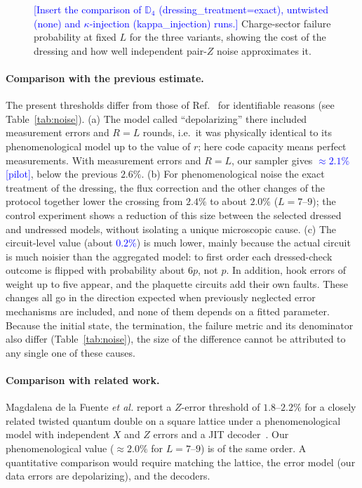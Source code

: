 \documentclass[a4paper]{article}
\newcommand{\blue}[1]{\textcolor{blue}{#1}}
\begin{document}
\begin{figure}[t]
  \centering
  \fbox{\rule{0pt}{50mm}\rule{0.82\linewidth}{0pt}}
  \caption{\blue{[Insert the comparison of $\mathbb{D}_4$ (dressing\_treatment=exact), untwisted (none) and $\kappa$-injection (kappa\_injection) runs.]} Charge-sector failure probability at fixed $L$ for the three variants, showing the cost of the dressing and how well independent pair-$Z$ noise approximates it.}
  \label{fig:control}
\end{figure}

\paragraph{Comparison with the previous estimate.}
The present thresholds differ from those of Ref.~\cite{haga2026aqis} for identifiable reasons (see Table~\ref{tab:noise}). (a) The model called ``depolarizing'' there included measurement errors and $R=L$ rounds, i.e.\ it was physically identical to its phenomenological model up to the value of $r$; here code capacity means perfect measurements. With measurement errors and $R=L$, our sampler gives \blue{$\approx2.1\%$ [pilot]}, below the previous $2.6\%$. (b) For phenomenological noise the exact treatment of the dressing, the flux correction and the other changes of the protocol together lower the crossing from $2.4\%$ to about $2.0\%$ ($L=7$--$9$); the control experiment shows a reduction of this size between the selected dressed and undressed models, without isolating a unique microscopic cause. (c) The circuit-level value (about \blue{$0.2\%$}) is much lower, mainly because the actual circuit is much noisier than the aggregated model: to first order each dressed-check outcome is flipped with probability about $6p$, not $p$. In addition, hook errors of weight up to five appear, and the plaquette circuits add their own faults. These changes all go in the direction expected when previously neglected error mechanisms are included, and none of them depends on a fitted parameter. Because the initial state, the termination, the failure metric and its denominator also differ (Table~\ref{tab:noise}), the size of the difference cannot be attributed to any single one of these causes.

\paragraph{Comparison with related work.}
Magdalena de la Fuente \emph{et al.} report a $Z$-error threshold of $1.8$--$2.2\%$ for a closely related twisted quantum double on a square lattice under a phenomenological model with independent $X$ and $Z$ errors and a JIT decoder~\cite{magdalena2026}. Our phenomenological value ($\approx2.0\%$ for $L=7$--$9$) is of the same order. A quantitative comparison would require matching the lattice, the error model (our data errors are depolarizing), and the decoders.
\end{document}
